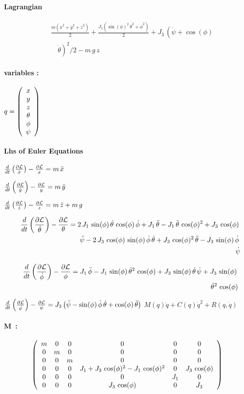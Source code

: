 \paragraph{Lagrangian} 
\begin{eqnarray*} && \frac{m\left(\dot{x}^2+\dot{y}^2+\dot{z}^2\right)
}{2}+\frac{J_1\left(\sin(\phi)^2\,\dot{\theta}^2+\dot{\phi}^2\right)}{
2}+J_3\,\left(\dot{\psi}+\cos(\phi)\,\right. \\&&\quad{}\left.{}
\dot{\theta}\right)^2\big/2-m\,g\,z \end{eqnarray*}
\paragraph{variables :} 
$  q =\left(\begin{array}{c} x \cr y \cr z \cr \theta \cr \phi \cr 
\psi \end{array} \right) $
\paragraph{Lhs of Euler Equations} 


$ \LL(x)=m\,\ddot{x} $

$ \LL(y)=m\,\ddot{y} $

$ \LL(z)=m\,\ddot{z}+m\,g $

\begin{eqnarray*} && \LL(\theta)=2\,J_1\,\sin(\phi)\,\dot{\theta}\,
\cos(\phi)\,\dot{\phi}+J_1\,\ddot{\theta}-J_1\,\ddot{\theta}\,\cos(
\phi)^2+J_3\,\cos(\phi)\, \\&&\quad{}\ddot{\psi}-2\,J_3\,\cos(\phi)\,
\sin(\phi)\,\dot{\phi}\,\dot{\theta}+J_3\,\cos(\phi)^2\,\ddot{\theta}-
J_3\,\sin(\phi)\,\dot{\phi}\, \\&&\quad{}\dot{\psi} \end{eqnarray*}

\begin{eqnarray*} && \LL(\phi)=J_1\,\ddot{\phi}-J_1\,\sin(\phi)\,
\dot{\theta}^2\,\cos(\phi)+J_3\,\sin(\phi)\,\dot{\theta}\,\dot{\psi}+J
_3\,\sin(\phi)\, \\&&\quad{}\dot{\theta}^2\,\cos(\phi) \end{eqnarray*}

$ \LL(\psi)=J_3\left(\ddot{\psi}-\sin(\phi)\,\dot{\phi}\,\dot{\theta}+
\cos(\phi)\,\ddot{\theta}\right) $
$M(q)\ddot{q}+C(q)\dot{q}^2 +R(q,\dot{q})$
\paragraph{M~:} 
$$ \left(\begin{array}{cccccc} m & 0 & 0 & 0 & 0 & 0 \cr 0 & m & 0 & 0
 & 0 & 0 \cr 0 & 0 & m & 0 & 0 & 0 \cr 0 & 0 & 0 & J_1+J_3\,\cos(\phi)
^2-J_1\,\cos(\phi)^2 & 0 & J_3\,\cos(\phi) \cr 0 & 0 & 0 & 0 & J_1 & 0
 \cr 0 & 0 & 0 & J_3\,\cos(\phi) & 0 & J_3 \end{array} \right) $$
